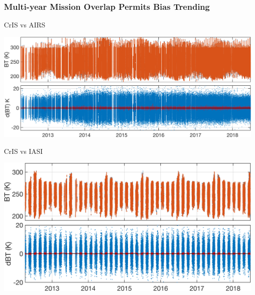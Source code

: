 \documentclass[10pt,t]{beamer}
\begin{document}
\begin{frame}
  \frametitle{Multi-year Mission Overlap Permits Bias Trending}
  \vspace{-0.15in}
  \begin{block}{\footnotesize CrIS vs AIRS}
    \begin{center}
  \vspace{-0.15in}      \includegraphics[width=0.7\linewidth]{./Figs/sno_ac1_lr_lw_window_trend_2012_18.png}
    \end{center}
  \end{block}
  \vspace{-0.2in}
  \begin{block}{\footnotesize CrIS vs IASI}
  \vspace{-0.15in}
    \begin{center}
      \includegraphics[width=0.7\linewidth]{./Figs/sno_i1c1_lr_lw_window_trend.png}
    \end{center}
  \end{block}
\end{frame}
    
\end{document}
